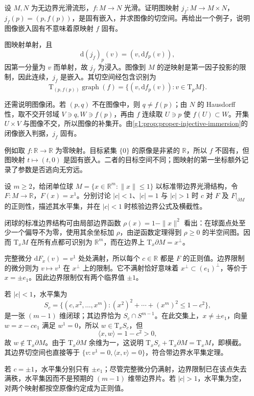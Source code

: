 \begin{exercise}\label{g1:ex:graph-proper-embedding}
	设 \(M,N\) 为无边界光滑流形，\(f:M\to N\) 光滑。证明图映射 \(j_f:M\to M\times N\)，\(j_f(p)=(p,f(p))\)，是固有嵌入，并求图像的切空间。再给出一个例子，说明图像嵌入固有不意味着原映射 \(f\) 固有。
\end{exercise}
\begin{solution}
	图映射单射，且
	\[
		\mathrm{d}(j_f)_p(v)=(v,\mathrm{d}f_p(v)),
	\]
	因第一分量为 \(v\) 而单射，故 \(j_f\) 为浸入。图像到 \(M\) 的逆映射是第一因子投影的限制，因此连续，\(j_f\) 是嵌入。其切空间经包含识别为
	\[
		\mathrm{T}_{(p,f(p))}\operatorname{graph}(f)
		=\{(v,\mathrm{d}f_p(v)):v\in \mathrm{T}_pM\}.
	\]

	还需说明图像闭。若 \((p,q)\) 不在图像中，则 \(q\ne f(p)\)；由 \(N\) 的 Hausdorff 性，取不交开邻域 \(V\ni q,W\ni f(p)\)，再由 \(f\) 连续取 \(U\ni p\) 使 \(f(U)\subset W\)。开集 \(U\times V\) 与图像不交，所以图像的补集开。由\cref{g1:prop:proper-injective-immersion}的闭像嵌入判据，\(j_f\) 固有。

	例如取 \(f:\mathbb R\to\mathbb R\) 为零映射。目标紧集 \(\{0\}\) 的原像是非紧的 \(\mathbb R\)，所以 \(f\) 不固有，但图映射 \(t\mapsto(t,0)\) 是固有嵌入。二者的目标空间不同；图映射的第一坐标额外记录了参数是否逃向无穷远。
\end{solution}

\begin{exercise}\label{g1:ex:ball-boundary-regular-level}
	设 \(m\ge2\)，给闭单位球 \(M=\{x\in\mathbb R^m:\|x\|\le1\}\) 以标准带边界光滑结构，令 \(F:M\to\mathbb R\)，\(F(x)=x^1\)。分别讨论 \(|c|<1\)、\(|c|=1\) 与 \(|c|>1\) 时 \(c\) 对 \(F\) 及 \(F|_{\partial M}\) 的正则性，描述其水平集，并在 \(|c|<1\) 时核验边界公式及横截性。
\end{exercise}
\begin{solution}
	闭球的标准边界结构可由局部边界函数 \(\rho(x)=1-\|x\|^2\) 看出：在球面点处至少一个偏导不为零，使用其余坐标加 \(\rho\)，由逆函数定理得到 \(\rho\ge0\) 的半空间图。因而 \(\mathrm{T}_xM\) 在所有点都可识别为 \(\mathbb R^m\)，而在边界上 \(\mathrm{T}_x\partial M=x^\perp\)。

	完整微分 \(\mathrm{d}F_x(v)=v^1\) 处处满射，所以每个 \(c\in\mathbb R\) 都是 \(F\) 的正则值。边界限制的微分则为 \(v\mapsto v^1\) 在 \(x^\perp\) 上的限制。它不满射恰好意味着 \(x^\perp\subset(e_1)^\perp\)，等价于 \(x=\pm e_1\)。因此边界限制仅有两个临界值 \(\pm1\)。

	若 \(|c|<1\)，水平集为
	\[
		S_c=\{(c,x^2,\ldots,x^m):(x^2)^2+\cdots+(x^m)^2\le1-c^2\},
	\]
	是一张 \((m-1)\) 维闭球；其边界恰为 \(S_c\cap S^{m-1}\)。在此交集上，\(x\ne\pm e_1\)，向量 \(w=x-ce_1\) 满足 \(w^1=0\)，所以 \(w\in \mathrm{T}_xS_c\)，但
	\[
		\langle x,w\rangle=1-c^2>0,
	\]
	故 \(w\notin \mathrm{T}_x\partial M\)。由于 \(\mathrm{T}_x\partial M\) 余维为一，这说明 \(\mathrm{T}_xS_c+\mathrm{T}_x\partial M=\mathrm{T}_xM\)，即横截。其边界切空间也直接等于 \(\{v:v^1=0,\langle x,v\rangle=0\}\)，符合带边界水平集定理。

	若 \(c=\pm1\)，水平集分别只有 \(\pm e_1\)；尽管完整微分仍满射，边界限制已在该点失去满秩，水平集因而不是预期的 \((m-1)\) 维带边界片。若 \(|c|>1\)，水平集为空，对两个映射都按空原像约定成为正则值。
\end{solution}

